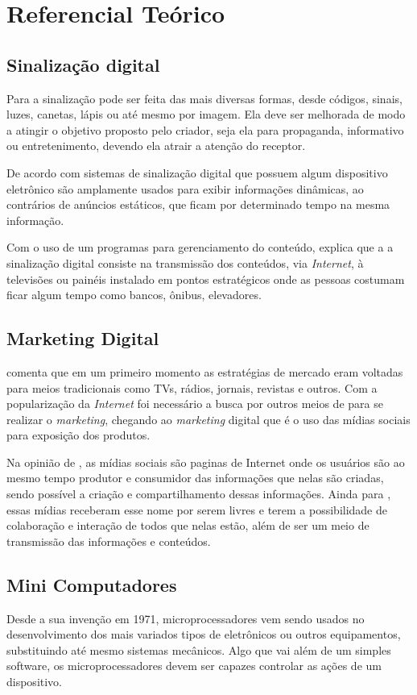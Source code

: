 \chapter[Referencial Teórico]{Referencial Teórico}
\section{Sinalização digital}
Para \cite{munari2006} a sinalização pode ser feita das mais diversas formas, desde códigos, sinais, luzes, canetas, lápis ou até mesmo por imagem. Ela deve ser melhorada de modo a  atingir o objetivo proposto pelo criador, seja ela para propaganda, informativo ou entretenimento, devendo ela atrair a atenção do receptor. 

De acordo com \cite{mishima2016} sistemas de sinalização digital que possuem algum dispositivo eletrônico são amplamente usados para exibir informações dinâmicas, ao contrários de anúncios estáticos, que ficam por determinado tempo na mesma informação. 

Com o uso de um programas para gerenciamento do conteúdo, \cite{machado2010} explica que a a sinalização digital consiste na transmissão dos conteúdos, via \textit{Internet}, à televisões ou painéis instalado em pontos estratégicos onde as pessoas costumam ficar algum tempo como bancos, ônibus, elevadores.

\section{Marketing Digital}
\cite{santos2014} comenta que em um primeiro momento as estratégias de mercado eram voltadas para meios tradicionais como TVs, rádios, jornais, revistas e outros. Com a popularização da \textit{Internet} foi necessário a busca por outros meios de para se realizar o \textit{marketing}, chegando ao \textit{marketing} digital que é o uso das mídias sociais para exposição dos produtos.

Na opinião de \cite{torres2000}, as mídias sociais são paginas de Internet onde os usuários são ao mesmo tempo produtor e consumidor das informações que nelas são criadas, sendo possível a criação e compartilhamento dessas informações. Ainda para \cite{torres2000}, essas mídias receberam esse nome por serem livres e terem a possibilidade de colaboração e interação de todos que nelas estão, além de ser um meio de transmissão das informações e conteúdos.

\section{Mini Computadores}
Desde a sua invenção em 1971, microprocessadores vem sendo usados no desenvolvimento dos mais variados tipos de eletrônicos ou outros equipamentos, substituindo até mesmo sistemas mecânicos. Algo que vai além de um simples software, os microprocessadores devem ser capazes controlar as ações de um dispositivo. \cite{rosenstark2007}

